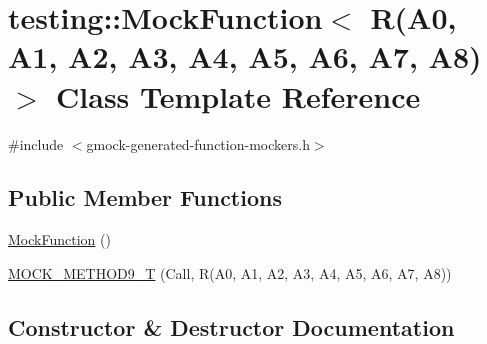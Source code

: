 \hypertarget{classtesting_1_1_mock_function_3_01_r_07_a0_00_01_a1_00_01_a2_00_01_a3_00_01_a4_00_01_a5_00_01_a6_00_01_a7_00_01_a8_08_4}{}\section{testing\+:\+:Mock\+Function$<$ R(A0, A1, A2, A3, A4, A5, A6, A7, A8)$>$ Class Template Reference}
\label{classtesting_1_1_mock_function_3_01_r_07_a0_00_01_a1_00_01_a2_00_01_a3_00_01_a4_00_01_a5_00_01_a6_00_01_a7_00_01_a8_08_4}


{\ttfamily \#include $<$gmock-\/generated-\/function-\/mockers.\+h$>$}

\subsection*{Public Member Functions}
\begin{DoxyCompactItemize}
\item 
\hyperlink{classtesting_1_1_mock_function_3_01_r_07_a0_00_01_a1_00_01_a2_00_01_a3_00_01_a4_00_01_a5_00_01_a6_00_01_a7_00_01_a8_08_4_a67f9fca4cf71a5811add15da604a6bbf}{Mock\+Function} ()
\item 
\hyperlink{classtesting_1_1_mock_function_3_01_r_07_a0_00_01_a1_00_01_a2_00_01_a3_00_01_a4_00_01_a5_00_01_a6_00_01_a7_00_01_a8_08_4_a0fee6ada67063cc8ec8b2181021f0195}{M\+O\+C\+K\+\_\+\+M\+E\+T\+H\+O\+D9\+\_\+T} (Call, R(A0, A1, A2, A3, A4, A5, A6, A7, A8))
\end{DoxyCompactItemize}


\subsection{Constructor \& Destructor Documentation}
